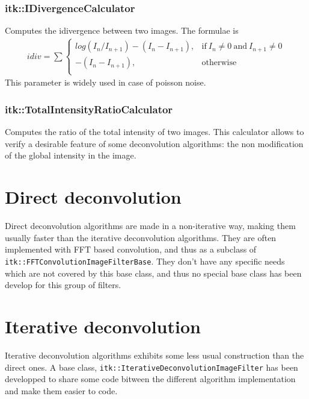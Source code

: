 \documentclass{InsightArticle}
\begin{document}
\subsubsection{itk::IDivergenceCalculator}

Computes the idivergence between two images.
The formulae is 
\begin{eqnarray}
\label{eq:imageFormation}
idiv = \sum 
\begin{cases} 
  log( I_n/I_{n+1} ) - ( I_n - I_{n+1} ),  & \text{if}~ I_n \ne 0 ~\text{and}~ I_{n+1} \ne 0 \\
  - ( I_n - I_{n+1} ),  & \text{otherwise} \\
\end{cases}
\end{eqnarray}
This parameter is widely used in case of poisson noise.

\subsubsection{itk::TotalIntensityRatioCalculator}

Computes the ratio of the total intensity of two images. This calculator allows to verify a desirable feature of some deconvolution
algorithms: the non modification of the global intensity in the image.

\section{Direct deconvolution}

Direct deconvolution algorithms are made in a non-iterative way, making them usually faster than the iterative deconvolution algorithms.
They are often implemented with FFT based convolution, and thus as a subclass of \verb$itk::FFTConvolutionImageFilterBase$. They don't
have any specific needs which are not covered by this base class, and thus no special base class has been develop for this group
of filters.

\section{Iterative deconvolution}

Iterative deconvolution algorithms exhibits some less usual construction than the direct ones. A base class, \verb$itk::IterativeDeconvolutionImageFilter$
has been developped to share some code bitween the different algorithm implementation and make them easier to code.
\end{document}
